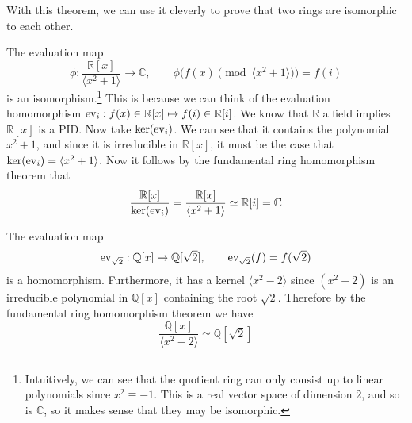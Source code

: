   With this theorem, we can use it cleverly to prove that two rings are isomorphic to each other. 

  \begin{example}
    The evaluation map 
    \begin{equation}
      \phi: \frac{\mathbb{R}[x]}{\langle x^2 + 1 \rangle} \rightarrow \mathbb{C}, \qquad \phi\big( f(x) \pmod{\langle x^2 + 1 \rangle} \big) = f(i)
    \end{equation}
    is an isomorphism.\footnote{Intuitively, we can see that the quotient ring can only consist up to linear polynomials since $x^2 \equiv -1$. This is a real vector space of dimension $2$, and so is $\mathbb{C}$, so it makes sense that they may be isomorphic. } This is because we can think of the evaluation homomorphism $\operatorname{ev}_i : f(x) \in \mathbb{R}[x] \mapsto f(i) \in \mathbb{R}[i]$. We know that $\mathbb{R}$ a field implies $\mathbb{R}[x]$ is a PID. Now take $\ker(\operatorname{ev}_i)$. We can see that it contains the polynomial $x^2 + 1$, and since it is irreducible in $\mathbb{R}[x]$, it must be the case that $\ker(\operatorname{ev}_i) = \langle x^2 + 1 \rangle$. Now it follows by the fundamental ring homomorphism theorem that 
    \begin{equation}
      \frac{\mathbb{R}[x]}{\ker(\operatorname{ev}_i)} = \frac{\mathbb{R}[x]}{\langle x^2 + 1 \rangle} \simeq \mathbb{R}[i] = \mathbb{C}
    \end{equation}
  \end{example} 

  \begin{example}
    The evaluation map 
    \begin{equation}
      \operatorname{ev}_{\sqrt{2}}: \mathbb{Q}[x] \mapsto \mathbb{Q}[\sqrt{2}], \qquad \operatorname{ev}_{\sqrt{2}} (f) = f(\sqrt{2}) 
    \end{equation}
    is a homomorphism. Furthermore, it has a kernel $\langle x^2 - 2 \rangle$ since $(x^2 - 2)$ is an irreducible polynomial in $\mathbb{Q}[x]$ containing the root $\sqrt{2}$. Therefore by the fundamental ring homomorphism theorem we have 
    \begin{equation}
      \frac{\mathbb{Q}[x]}{\langle x^2 - 2 \rangle} \simeq \mathbb{Q}[\sqrt{2}]
    \end{equation}
  \end{example} 


